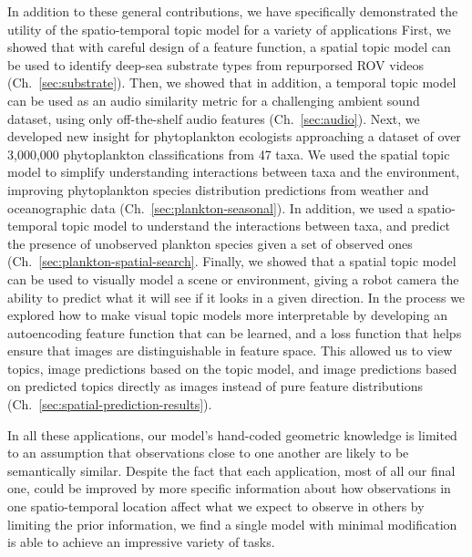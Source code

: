 In addition to these general contributions, we have specifically demonstrated the utility of the spatio-temporal topic model for a variety of applications First, we showed that with careful design of a feature function, a spatial topic model can be used to identify deep-sea substrate types from repurporsed ROV videos (Ch.~\ref{sec:substrate}). Then, we showed that in addition, a temporal topic model can be used as an audio similarity metric for a challenging ambient sound dataset, using only off-the-shelf audio features (Ch.~\ref{sec:audio}). Next, we developed new insight for phytoplankton ecologists approaching a dataset of over 3,000,000 phytoplankton classifications from 47 taxa. We used the spatial topic model to simplify understanding interactions between taxa and the environment, improving phytoplankton species distribution predictions from weather and oceanographic data (Ch.~\ref{sec:plankton-seasonal}). In addition, we used a spatio-temporal topic model to understand the interactions between taxa, and predict the presence of unobserved plankton species given a set of observed ones (Ch.~\ref{sec:plankton-spatial-search}. Finally, we showed that a spatial topic model can be used to visually model a scene or environment, giving a robot camera the ability to predict what it will see if it looks in a given direction. In the process we explored how to make visual topic models more interpretable by developing an autoencoding feature function that can be learned, and a loss function that helps ensure that images are distinguishable in feature space. This allowed us to view topics, image predictions based on the topic model, and image predictions based on predicted topics directly as images instead of pure feature distributions (Ch.~\ref{sec:spatial-prediction-results}).

In all these applications, our model's hand-coded geometric knowledge is limited to an assumption that observations close to one another are likely to be semantically similar. Despite the fact that each application, most of all our final one, could be improved by more specific information about how observations in one spatio-temporal location affect what we expect to observe in others by limiting the prior information, we find a single model with minimal modification is able to achieve an impressive variety of tasks.

